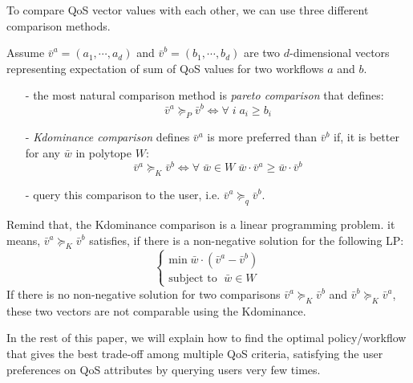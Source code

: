 \documentclass{sigchi}
\begin{document}
To compare QoS vector values with each other, we can use three different comparison methods.

Assume $\bar{v}^a = (a_1, \cdots, a_d)$  and $\bar{v}^b = (b_1, \cdots, b_d)$ are two $d$-dimensional vectors representing expectation of sum of QoS values for two workflows $a$ and $b$. 

\begin{itemize}
\item[-] the most natural comparison method is \emph{pareto comparison} that defines:
\begin{equation}
\bar{v}^a \succeq_P \bar{v}^b \Leftrightarrow \forall \; i \; a_i \geq b_i
\end{equation}
\item[-] \emph{Kdominance comparison} defines $\bar{v}^a$ is more preferred than $\bar{v}^b$ if, it is better for any $\bar{w}$ in polytope $W$:
\begin{equation}
\bar{v}^a \succeq_K \bar{v}^b \Leftrightarrow \forall \; \bar{w} \in W \; \bar{w} \cdot \bar{v}^a \geq \bar{w} \cdot \bar{v}^b
\end{equation}
\item[-] query this comparison to the user, i.e. $\bar{v}^a  \succeq_q \bar{v}^b$. 
\end{itemize} 

Remind that, the Kdominance comparison is a linear programming problem. it means, $\bar{v}^a  \succeq_K \bar{v}^b$ satisfies, if there is a non-negative solution for the following LP:
\begin{equation}
\left\{
\begin{array}{ll}
\text{min} \; \bar{w} \cdot (\bar{v}^a - \bar{v}^b) \\
\text{subject to } \; \bar{w} \in W
\end{array}
\right.
\end{equation}
If there is no non-negative solution for two comparisons $\bar{v}^a  \succeq_K \bar{v}^b$ and $\bar{v}^b  \succeq_K \bar{v}^a$, these two vectors are not comparable using the Kdominance. 

In the rest of this paper, we will explain how to find the optimal policy/workflow that gives the best trade-off among multiple QoS criteria, satisfying the user preferences on QoS attributes by querying users very few times. %
\end{document}
